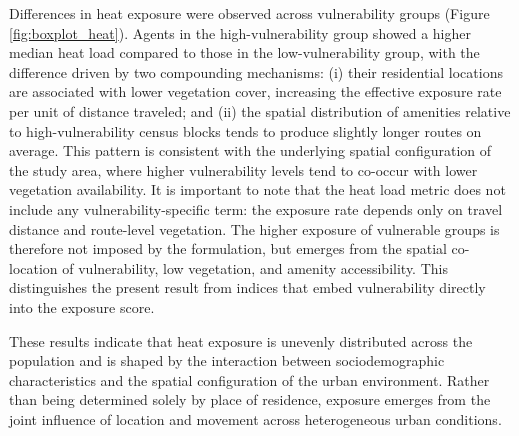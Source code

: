 \documentclass{wscpaperproc}
\theoremstyle{wsc}
\begin{document}
Differences in heat exposure were observed across vulnerability groups (Figure \ref{fig:boxplot_heat}). Agents in the high-vulnerability group showed a higher median heat load compared to those in the low-vulnerability group, with the difference driven by two compounding mechanisms: (i) their residential locations are associated with lower vegetation cover, increasing the effective exposure rate per unit of distance traveled; and (ii) the spatial distribution of amenities relative to high-vulnerability census blocks tends to produce slightly longer routes on average. %
This pattern is consistent with the underlying spatial configuration of the study area, where higher vulnerability levels tend to co-occur with lower vegetation availability. %
It is important to note that the heat load metric does not include any vulnerability-specific term: the exposure rate depends only on travel distance and route-level vegetation. The higher exposure of vulnerable groups is therefore not imposed by the formulation, but emerges from the spatial co-location of vulnerability, low vegetation, and amenity accessibility. This distinguishes the present result from indices that embed vulnerability directly into the exposure score.

These results indicate that heat exposure is unevenly distributed across the population and is shaped by the interaction between sociodemographic characteristics and the spatial configuration of the urban environment. Rather than being determined solely by place of residence, exposure emerges from the joint influence of location and movement across heterogeneous urban conditions.
\end{document}
